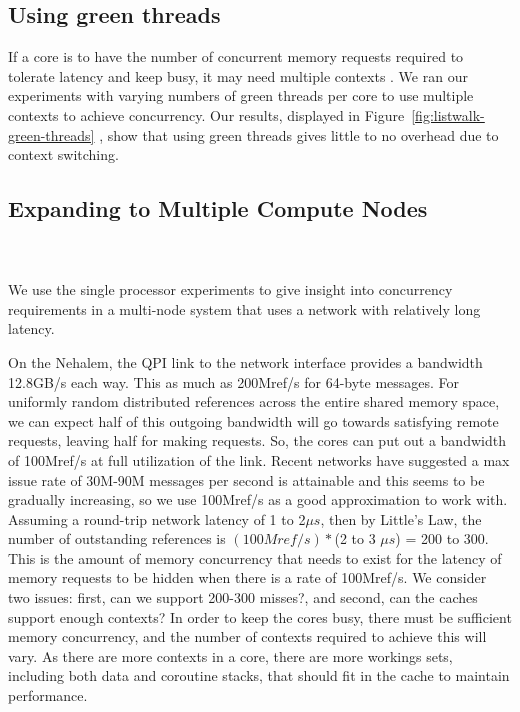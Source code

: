 \subsection{Using green threads}
	If a core is to have the number of concurrent memory requests required to tolerate latency and keep busy, it may need multiple contexts .  We ran our experiments with varying numbers of green threads per core to use multiple contexts to achieve concurrency. Our results, displayed in Figure~\ref{fig:listwalk-green-threads} , show that using green threads gives little to no overhead due to context switching. 


\subsection{Expanding to Multiple Compute Nodes}
	\\
	\\
	We use the single processor experiments to give insight into concurrency requirements in a multi-node system that uses a network with relatively long latency. 
	
	On the Nehalem, the QPI link to the network interface provides a bandwidth 12.8GB/s each way. This as much as 200Mref/s for 64-byte messages. For uniformly random distributed references across the entire shared memory space, we can expect half of this outgoing bandwidth will go towards satisfying remote requests, leaving half for making requests.  So, the cores can put out a bandwidth of 100Mref/s at full utilization of the link. Recent networks have suggested a max issue rate of 30M-90M messages per second is attainable  and this seems to be gradually increasing, so we use 100Mref/s as a good approximation to work with. Assuming a round-trip network latency of 1 to 2$\mu s$, then by Little's Law, the number of outstanding references is $(100Mref/s) * $(2 to 3 $\mu s$) = 200 to 300. This is the amount of memory concurrency that needs to exist for the latency of memory requests to be hidden when there is a rate of 100Mref/s.
We consider two issues: first, can we support 200-300 misses?, and second, can the caches support enough contexts? 
 In order to keep the cores busy, there must be sufficient memory concurrency, and the number of contexts required to achieve this will vary. As there are more contexts in a core, there are more workings sets, including both data and coroutine stacks, that should fit in the cache to maintain performance.
	
